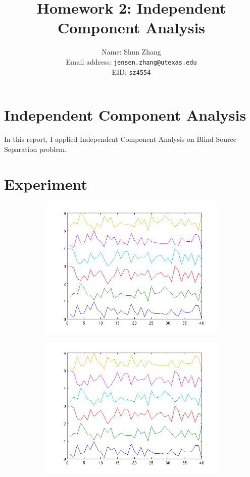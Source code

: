 \documentclass[10pt]{article}
\title{Homework 2: Independent Component Analysis}
\author{Name: Shun Zhang\\
Email address: \texttt{jensen.zhang@utexas.edu}\\
EID: \texttt{sz4554}}
\date{}
\begin{document}
\maketitle

\section{Independent Component Analysis}

In this report, I applied Independent Component Analysis on Blind Source
Separation problem.

\section{Experiment}

\begin{figure}
\centering
\begin{subfigure}[b]{0.49\textwidth}
	\includegraphics[width=\textwidth]{rep2.png}
\end{subfigure}
\begin{subfigure}[b]{0.49\textwidth}
	\includegraphics[width=\textwidth]{rep3.png}

\end{subfigure}
\end{figure}
\end{document}
